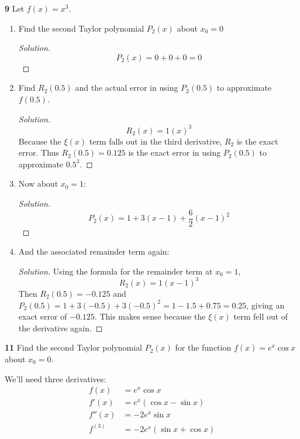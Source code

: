 \documentclass{article}
\newcommand{\paren}[1]{\left( #1 \right)}
\newenvironment{solution}{\begin{proof}[Solution]}{\end{proof}}
\begin{document}
\textbf{9}  %
Let $f(x) = x^3$.
\begin{enumerate}
    \item 
    Find the second Taylor polynomial $P_2(x)$ about $x_0 = 0$
    \begin{solution}
        $$P_2(x) = 0 + 0 + 0 = 0$$
    \end{solution}

    \item 
    Find $R_2(0.5)$ and the actual error in using $P_2(0.5)$ to approximate $f(0.5)$.
    \begin{solution}
        $$R_2(x) = 1(x)^3$$
        Because the $\xi(x)$ term falls out in the third derivative, $R_2$ is the exact error. Thus $R_2(0.5) = 0.125$ is the exact error in using $P_2(0.5)$ to approximate $0.5^3$.
    \end{solution}

    \item 
    Now about $x_0 = 1$:
    \begin{solution}
        $$P_2(x) = 1 + 3(x - 1) + \frac{6}{2}(x - 1)^2$$
    \end{solution}

    \item 
    And the associated remainder term again:
    \begin{solution}
        Using the formula for the remainder term at $x_0 = 1$,
        $$R_2(x) = 1(x - 1)^3$$
        Then $R_2(0.5) = -0.125$ and $P_2(0.5) = 1 + 3(-0.5) + 3(-0.5)^2 = 1 - 1.5 + 0.75 = 0.25$, giving an exact error of $-0.125$. This makes sense because the $\xi(x)$ term fell out of the derivative again.
    \end{solution}

\end{enumerate}


\textbf{11}
Find the second Taylor polynomial $P_2(x)$ for the function $f(x) = e^x \cos x$ about $x_0 = 0$.

We'll need three derivatives:
\begin{align*}
    f(x) &= e^x \cos x \\
    f'(x) &= e^x \paren{\cos x - \sin x} \\
    f''(x) &= -2e^x \sin x \\
    f^{(3)} &= -2e^x(\sin x + \cos x)
\end{align*}
\end{document}

